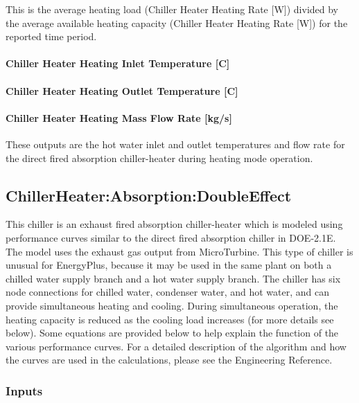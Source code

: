 This is the average heating load (Chiller Heater Heating Rate {[}W{]}) divided by the average available heating capacity (Chiller Heater Heating Rate {[}W{]}) for the reported time period.

\paragraph{Chiller Heater Heating Inlet Temperature {[}C{]}}\label{chiller-heater-heating-inlet-temperature-c}

\paragraph{Chiller Heater Heating Outlet Temperature {[}C{]}}\label{chiller-heater-heating-outlet-temperature-c}

\paragraph{Chiller Heater Heating Mass Flow Rate {[}kg/s{]}}\label{chiller-heater-heating-mass-flow-rate-kgs}

These outputs are the hot water inlet and outlet temperatures and flow rate for the direct fired absorption chiller-heater during heating mode operation.

\subsection{ChillerHeater:Absorption:DoubleEffect}\label{chillerheaterabsorptiondoubleeffect}

This chiller is an exhaust fired absorption chiller-heater which is modeled using performance curves similar to the direct fired absorption chiller in DOE-2.1E. The model uses the exhaust gas output from MicroTurbine. This type of chiller is unusual for EnergyPlus, because it may be used in the same plant on both a chilled water supply branch and a hot water supply branch. The chiller has six node connections for chilled water, condenser water, and hot water, and can provide simultaneous heating and cooling. During simultaneous operation, the heating capacity is reduced as the cooling load increases (for more details see below). Some equations are provided below to help explain the function of the various performance curves. For a detailed description of the algorithm and how the curves are used in the calculations, please see the Engineering Reference.

\subsubsection{Inputs}\label{inputs-9-014}

